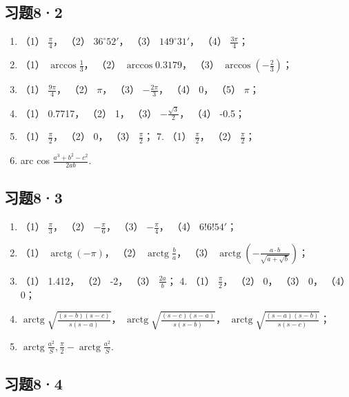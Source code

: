 \subsection{习题8·2}

\begin{enumerate}
\item
  （1） \(\frac{\pi}{4}\)， （2） \(36^{\circ}52'\)， （3）
  \(149^{\circ}31'\)， （4） \(\frac{3\pi}{4}\)；
\item
  （1） \(\arccos \frac{1}{3}\)， （2） \(\arccos 0.3179\)， （3）
  \(\arccos \left(-\frac{2}{3}\right)\)；
\item
  （1） \(\frac{9\pi}{4}\)， （2） \(\pi\)， （3） \(-\frac{2\pi}{3}\)，
  （4） 0， （5） \(\pi\)；
\item
  （1） 0.7717， （2） 1， （3） \(-\frac{\sqrt{3}}{2}\)， （4） -0.5；
\item
  （1） \(\frac{\pi}{2}\)， （2） 0， （3） \(\frac{\pi}{2}\)； 7. （1）
  \(\frac{\pi}{2}\)， （2） \(\frac{\pi}{2}\)；
\item
  arc cos \(\frac{a^3 + b^2 - c^2}{2ab}\).
\end{enumerate}

\subsection{习题8·3}

\begin{enumerate}
\item
  （1） \(\frac{\pi}{3}\)， （2） \(-\frac{\pi}{6}\)， （3）
  \(-\frac{\pi}{4}\)， （4） \(6!6!54'\)；
\item
  （1） \(\operatorname{arctg}(-\pi)\)， （2）
  \(\operatorname{arctg} \frac{b}{a}\)， （3）
  \(\operatorname{arctg}\left(-\frac{a \cdot b}{\sqrt{a + \sqrt{b}}}\right)\)；
\item
  （1） 1.412， （2） -2， （3） \(\frac{2a}{b}\)； 4. （1）
  \(\frac{\pi}{2}\)， （2） 0， （3） 0， （4） 0；
\item
  \(\operatorname{arctg}\sqrt{\frac{(s - b)(s - c)}{s(s - a)}}\)，
  \(\operatorname{arctg}\sqrt{\frac{(s - c)(s - a)}{s(s - b)}}\)，
  \(\operatorname{arctg}\sqrt{\frac{(s - a)(s - b)}{s(s - c)}}\)；
\item
  \(\operatorname{arctg} \frac{a^2}{S}, \frac{\pi}{2} - \operatorname{arctg} \frac{a^2}{S}\).
\end{enumerate}

\subsection{习题8·4}

